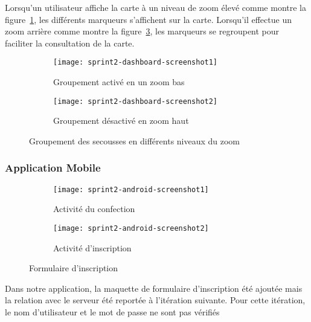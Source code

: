 Lorsqu'un utilisateur affiche la carte à un niveau de zoom élevé comme montre
la figure~\ref{fig:sprint2-dashboard-screenshot1}, les différents marqueurs
s'affichent sur la carte. Lorsqu'il effectue un zoom arrière comme montre la
figure~\ref{fig:sprint2-dashboard-screenshot2}, les marqueurs se regroupent
pour faciliter la consultation de la carte.

\begin{figure}[H]
    \begin{subfigure}{.5\textwidth}
        \centering
        \texttt{[image: sprint2-dashboard-screenshot1]}
        \caption{Groupement activé en un zoom bas}
\label{fig:sprint2-dashboard-screenshot1}
    \end{subfigure}
    \begin{subfigure}{.5\textwidth}
        \centering
        \texttt{[image: sprint2-dashboard-screenshot2]}
        \caption{Groupement désactivé en zoom haut}
\label{fig:sprint2-dashboard-screenshot2}
    \end{subfigure}
    \caption{Groupement des secousses en différents niveaux du zoom}
\end{figure}

\subsubsection{Application Mobile }

\begin{figure}[H]
\centering
    \begin{subfigure}{.45\textwidth}
        \centering
        \centering
        \texttt{[image: sprint2-android-screenshot1]}
        \caption{Activité du confection}
\label{fig:sprint2-android-screenshot1}
    \end{subfigure}
    \begin{subfigure}{.45\textwidth}
        \centering
        \centering
        \texttt{[image: sprint2-android-screenshot2]}
        \caption{Activité d'inscription}
\label{fig:sprint2-android-screenshot2}
    \end{subfigure}
    \caption{Formulaire d'inscription}
\end{figure}

Dans notre application, la maquette de formulaire d'inscription été ajoutée
mais la relation avec le serveur été reportée à l'itération suivante. Pour
cette itération, le nom d'utilisateur et le mot de passe ne sont pas vérifiés

